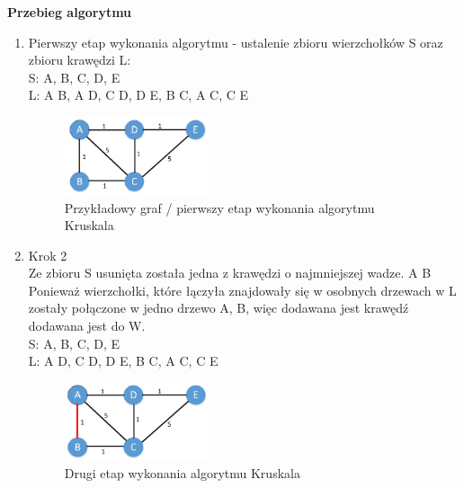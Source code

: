 \begin{center}
	\textbf{Przebieg algorytmu}
\end{center}
\begin{enumerate}
	\item Pierwszy etap wykonania algorytmu - ustalenie zbioru wierzchołków S oraz zbioru krawędzi L:\\
	S: {A}, {B}, {C}, {D}, {E}
\\
	L: {A B}, {A D}, {C D}, {D E}, {B C}, {A C}, {C E}
\\
	\begin{figure}[htb!]
		\centering
		\includegraphics[width=0.4\textwidth]{tex/fig/Picture2}
		\caption{Przykładowy graf / pierwszy etap wykonania algorytmu Kruskala}
		\label{fig: legendK1}
	\end{figure}

\newpage
\item Krok 2\\
Ze zbioru S usunięta została jedna z krawędzi o najmniejszej wadze. {A B} Ponieważ wierzchołki, które łączyła znajdowały się w osobnych drzewach w L zostały połączone w jedno drzewo {A, B}, więc dodawana jest krawędź dodawana jest do W.\\
S: {A, B}, {C}, {D}, {E}
\\
L: {A D}, {C D}, {D E}, {B C}, {A C}, {C E}
\\
	\begin{figure}[htb!]
	\centering
	\includegraphics[width=0.4\textwidth]{tex/fig/Picture3}
	\caption{Drugi etap wykonania algorytmu Kruskala}
	\label{fig: legendK2}
\end{figure}


\end{enumerate}
